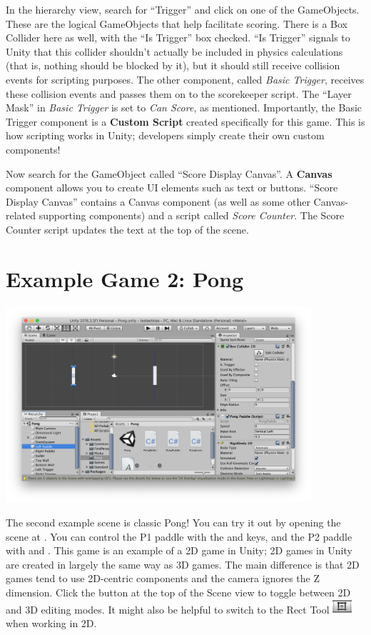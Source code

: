 \documentclass[11pt]{article}
\begin{document}
In the hierarchy view, search for ``Trigger'' and click on one of the GameObjects.  These are the logical GameObjects that help facilitate scoring.  There is a Box Collider here as well, with the ``Is Trigger'' box checked.  ``Is Trigger'' signals to Unity that this collider shouldn't actually be included in physics calculations (that is, nothing should be blocked by it), but it should still receive collision events for scripting purposes.  The other component, called \textit{Basic Trigger}, receives these collision events and passes them on to the scorekeeper script.  The ``Layer Mask'' in \textit{Basic Trigger} is set to \textit{Can Score}, as mentioned.  Importantly, the Basic Trigger component is a \textbf{Custom Script} created specifically for this game.  This is how scripting works in Unity; developers simply create their own custom components!

Now search for the GameObject called ``Score Display Canvas''.  A \textbf{Canvas} component allows you to create UI elements such as text or buttons.  ``Score Display Canvas'' contains a Canvas component (as well as some other Canvas-related supporting components) and a script called \textit{Score Counter}.  The Score Counter script updates the text at the top of the scene.

\section{Example Game 2: Pong}

\begin{center}
\centering \noindent
\includegraphics[width=0.85\textwidth]{pong}
\end{center}

The second example scene is classic Pong!  You can try it out by opening the scene at .  You can control the P1 paddle with the  and  keys, and the P2 paddle with \keys{\arrowkeyup} and \keys{\arrowkeydown}.  This game is an example of a 2D game in Unity; 2D games in Unity are created in largely the same way as 3D games.  The main difference is that 2D games tend to use 2D-centric components and the camera ignores the Z dimension.  Click the  button at the top of the Scene view to toggle between 2D and 3D editing modes.  It might also be helpful to switch to the Rect Tool \includegraphics[width=20pt]{tool_rect.png} when working in 2D.
\end{document}
